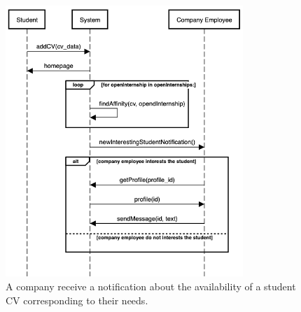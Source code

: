    \begin{figure}[H]
        \centering
        \includegraphics[width=0.8\textwidth]{RASD/Assets/SequenceDiagrams/6-matchmaking-new-student.png}
        \caption{A company receive a notification about the availability of a student CV corresponding to their needs.}
        \label{fig:A company receive a notification about the availability of a student CV corresponding to their needs}
    \end{figure}


